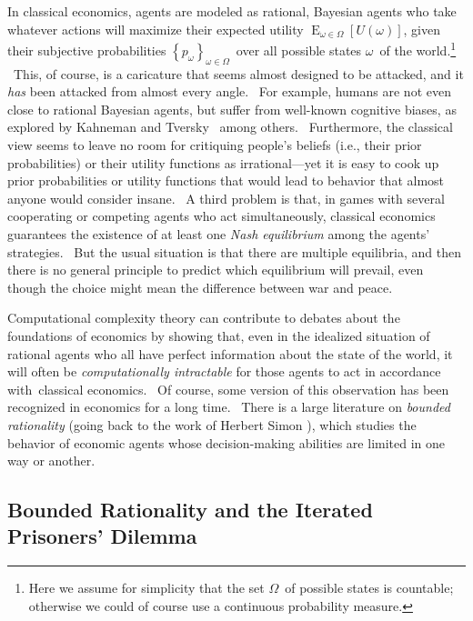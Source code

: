 \documentclass[11pt,onecolumn]{article}%
\begin{document}
In classical economics, agents are modeled as rational, Bayesian agents who
take whatever actions will maximize their expected utility $\operatorname*{E}%
_{\omega\in\Omega}\left[  U\left(  \omega\right)  \right]  $, given their
subjective probabilities $\left\{  p_{\omega}\right\}  _{\omega\in\Omega}%
$\ over all possible states $\omega$\ of the world.\footnote{Here we assume
for simplicity that the set $\Omega$\ of possible states is countable;
otherwise we could of course use a continuous probability measure.} \ This, of
course, is a caricature that seems almost designed to be attacked, and it
\textit{has} been attacked from almost every angle. \ For example, humans are
not even close to rational Bayesian agents, but suffer from well-known
cognitive biases, as explored by Kahneman and Tversky \cite{kahnemantversky}%
\ among others. \ Furthermore, the classical view seems to leave no room for
critiquing people's beliefs (i.e., their prior probabilities) or their utility
functions as irrational---yet it is easy to cook up prior probabilities or
utility functions that would lead to behavior that almost anyone would
consider insane. \ A third problem is that, in games with several cooperating
or competing agents who act simultaneously, classical economics guarantees the
existence of at least one \textit{Nash equilibrium} among the agents'
strategies. \ But the usual situation is that there are multiple equilibria,
and then there is no general principle to predict which equilibrium will
prevail, even though the choice might mean the difference between war and peace.

Computational complexity theory can contribute to debates about the
foundations of economics by showing that, even in the idealized situation of
rational agents who all have perfect information about the state of the world,
it will often be \textit{computationally intractable} for those agents to act
in accordance with\ classical economics. \ Of course, some version of this
observation has been recognized in economics for a long time. \ There is a
large literature on \textit{bounded rationality} (going back to the work of
Herbert Simon \cite{herbsimon}), which studies the behavior of economic agents
whose decision-making abilities are limited in one way or another.

\subsection{Bounded Rationality and the Iterated Prisoners' Dilemma\label{IPD}%
}
\end{document}
